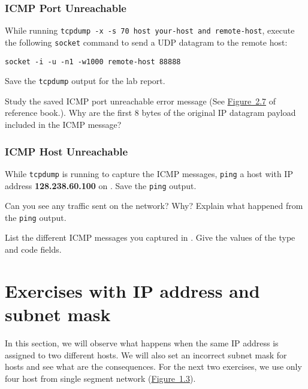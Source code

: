 \documentclass{../UTNetLab}
\begin{document}
\section{ICMP Port Unreachable}
    While running \lstinline[emph={your-host, remote-host}]{tcpdump -x -s 70 host your-host and remote-host}, execute the following \lstinline{socket} command to send a UDP datagram to the remote host:

    \begin{lstlisting}[emph={your-host, remote-host}]
socket -i -u -n1 -w1000 remote-host 88888
    \end{lstlisting}

    Save the \lstinline{tcpdump} output for the lab report.

    \begin{report}
    \item Study the saved ICMP port unreachable error message (See \hyperref[fig:2.7]{Figure~2.7} of reference book.).
    Why are the first 8 bytes of the original IP datagram payload included in the ICMP message?
    \end{report}

\section{ICMP Host Unreachable}
    While \lstinline{tcpdump} is running to capture the ICMP messages, \lstinline{ping} a host with IP address \textbf{128.238.60.100} on .
    Save the \lstinline{ping} output.
    
    \begin{report}
    \item Can you see any traffic sent on the network? Why? Explain what happened from the \lstinline{ping} output.

    \item List the different ICMP messages you captured in .
    Give the values of the type and code fields.
    \end{report}

\part{Exercises with IP address and subnet mask}
    In this section, we will observe what happens when the same IP address is assigned to two different hosts.
    We will also set an incorrect subnet mask for hosts and see what are the consequences.
    For the next two exercises, we use only four host from single segment network (\hyperref[fig:1.3]{Figure~1.3}).
\end{document}
